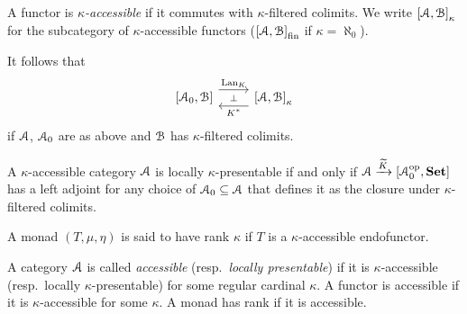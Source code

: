 \documentclass[a4paper,11pt,oneside,openany]{scrbook}
\begin{document}
\begin{defn}
A functor is \emph{$\kappa$-accessible} if it commutes with $\kappa$-filtered colimits. We write $\left[\operatorname{\mathcal{A}},\operatorname{\mathcal{B}}\right]_\kappa$ for the subcategory of $\kappa$-accessible functors ($\left[\operatorname{\mathcal{A}},\operatorname{\mathcal{B}}\right]_{\text{fin}}$ if $\kappa=\aleph_0$).
\end{defn}
It follows that 
 \[
\begin{tikzcd}
\left[\A_0,\B\right]\ar[r, shift left=1.5ex,"\Lan_K",""{name=A, below}] & \left[\A,\B\right]_\kappa\ar[l, shift left=1.5ex, "K^*",""{name=B,above}] \ar[from=A, to=B, "\perp"description]
\end{tikzcd}
      \]
if $\operatorname{\mathcal{A}}$, $\operatorname{\mathcal{A}}_0$ are as above and $\operatorname{\mathcal{B}}$ has $\kappa$-filtered colimits.
\begin{rmk}
    A $\kappa$-accessible category $\operatorname{\mathcal{A}}$ is locally $\kappa$-presentable if and only if $\operatorname{\mathcal{A}}\xrightarrow{\widetilde{K}}\left[\operatorname{\mathcal{A}}_0^{\operatorname{\text{op}}},{\normalfont\textbf{Set}}\right]$ has a left adjoint for any choice of $\operatorname{\mathcal{A}}_0\subseteq\operatorname{\mathcal{A}}$ that defines it as the closure under $\kappa$-filtered colimits.
\end{rmk}
\begin{defn}
A monad $(T,\mu,\eta)$ is said to have rank $\kappa$ if $T$ is a $\kappa$-accessible endofunctor.
\end{defn}
\begin{defn}
A category $\operatorname{\mathcal{A}}$ is called \emph{accessible} (resp.\ \emph{locally presentable}) if it is $\kappa$-accessible (resp.\ locally $\kappa$-presentable) for some regular cardinal $\kappa$. A functor is accessible if it is $\kappa$-accessible for some $\kappa$. A monad has rank if it is accessible.
\end{defn}
\end{document}
